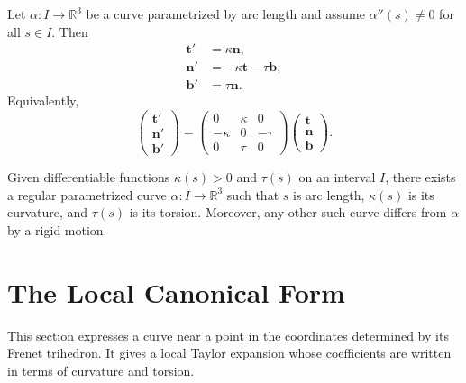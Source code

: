 \documentclass[12pt, oneside]{book}
\begin{document}
\begin{theorem}
    Let $\alpha:I\rightarrow \mathbb{R}^3$ be a curve parametrized by arc
    length and assume $\alpha''(s)\neq 0$ for all $s\in I$.  Then
    \[
        \begin{aligned}
            \mathbf{t}' & = \kappa \mathbf{n},                  \\
            \mathbf{n}' & = -\kappa \mathbf{t}-\tau \mathbf{b}, \\
            \mathbf{b}' & = \tau \mathbf{n}.
        \end{aligned}
    \]
    Equivalently,
    \[
        \begin{pmatrix}
            \mathbf{t}' \\
            \mathbf{n}' \\
            \mathbf{b}'
        \end{pmatrix}
        =
        \begin{pmatrix}
            0       & \kappa & 0     \\
            -\kappa & 0      & -\tau \\
            0       & \tau   & 0
        \end{pmatrix}
        \begin{pmatrix}
            \mathbf{t} \\
            \mathbf{n} \\
            \mathbf{b}
        \end{pmatrix}.
    \]
\end{theorem}

\begin{theorem}
    Given differentiable functions $\kappa(s)>0$ and $\tau(s)$ on an interval
    $I$, there exists a regular parametrized curve
    $\alpha:I\rightarrow \mathbb{R}^3$ such that $s$ is arc length,
    $\kappa(s)$ is its curvature, and $\tau(s)$ is its torsion.  Moreover, any
    other such curve differs from $\alpha$ by a rigid motion.
\end{theorem}

\section{The Local Canonical Form}

\begin{remark}
    This section expresses a curve near a point in the coordinates determined by
    its Frenet trihedron.  It gives a local Taylor expansion whose coefficients
    are written in terms of curvature and torsion.
\end{remark}
\end{document}
